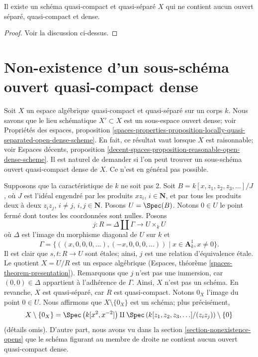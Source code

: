 \begin{lemma}
\label{lemma-no-dense-separated-quasi-compact-open-in-qcqs}
Il existe un schéma quasi-compact et quasi-séparé $X$ qui ne contient
aucun ouvert séparé, quasi-compact et dense.
\end{lemma}

\begin{proof}
Voir la discussion ci-dessus.
\end{proof}







\section{Non-existence d'un sous-schéma ouvert quasi-compact dense}
\label{section-nonexistence-qc-dense-open-subscheme}

\noindent
Soit $X$ un espace algébrique quasi-compact et quasi-séparé sur un corps
$k$. Nous savons que le lieu schématique $X' \subset X$ est un sous-espace
ouvert dense; voir
Propriétés des espaces, proposition
\ref{spaces-properties-proposition-locally-quasi-separated-open-dense-scheme}.
En fait, ce résultat vaut lorsque $X$ est raisonnable; voir
Espaces décents, proposition
\ref{decent-spaces-proposition-reasonable-open-dense-scheme}.
Il est naturel de demander si l'on peut trouver un sous-schéma ouvert
quasi-compact dense de $X$. Ce n'est en général pas possible.

\medskip\noindent
Supposons que la caractéristique de $k$ ne soit pas 2.
Soit $B = k[x, z_1, z_2, z_3, \ldots]/J$, où $J$ est l'idéal engendré par
les produits $xz_i$, $i \in \mathbf{N}$, et par tous les produits deux à deux
$z_iz_j$, $i \not = j$, $i, j \in \mathbf{N}$. Posons $U = \Spec(B)$.
Notons $0 \in U$ le point fermé dont toutes les coordonnées sont nulles.
Posons
$$
j : R = \Delta \amalg \Gamma \longrightarrow U \times_k U
$$
où $\Delta$ est l'image du morphisme diagonal de $U$ sur $k$ et
$$
\Gamma = \{((x, 0, 0, 0, \ldots), (-x, 0, 0, 0, \ldots))
\mid x \in \mathbf{A}^1_k, x \not = 0\}.
$$
Il est clair que $s, t : R \to U$ sont \'etales; ainsi,
$j$ est une relation d'équivalence \'etale. Le quotient $X = U/R$
est un espace algébrique (Espaces, théorème \ref{spaces-theorem-presentation}).
Remarquons que $j$ n'est pas une immersion, car
$(0, 0) \in \Delta$ appartient à l'adhérence de $\Gamma$.
Ainsi, $X$ n'est pas un schéma. En revanche, $X$ est quasi-séparé,
car $R$ est quasi-compact. Notons $0_X$ l'image du point $0 \in U$.
Nous affirmons que $X \setminus \{0_X\}$ est un schéma; plus précisément,
$$
X \setminus \{0_X\} =
\Spec\left(k[x^2, x^{-2}]\right) \amalg
\Spec\left(k[z_1, z_2, z_3, \ldots]/(z_iz_j)\right) \setminus \{0\}
$$
(détails omis). D'autre part, nous avons vu dans la
section \ref{section-nonexistence-opens} que le schéma
figurant au membre de droite ne contient
aucun ouvert quasi-compact dense.

